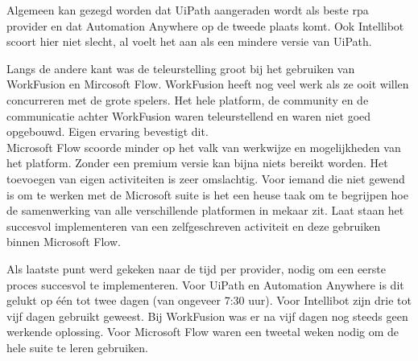 Algemeen kan gezegd worden dat UiPath aangeraden wordt als beste \acrshort{rpa} provider en dat Automation Anywhere op de tweede plaats komt. Ook Intellibot scoort hier niet slecht, al voelt het aan als een mindere versie van UiPath.

Langs de andere kant was de teleurstelling groot bij het gebruiken van WorkFusion en Mircosoft Flow. WorkFusion heeft nog veel werk als ze ooit willen concurreren met de grote spelers. Het hele platform, de community en de communicatie achter WorkFusion waren teleurstellend en waren niet goed opgebouwd. Eigen ervaring bevestigt dit.\\
Microsoft Flow scoorde minder op het valk van werkwijze en mogelijkheden van het platform. Zonder een premium versie kan bijna niets bereikt worden. Het toevoegen van eigen activiteiten is zeer omslachtig. Voor iemand die niet gewend is om te werken met de Microsoft suite is het een heuse taak om te begrijpen hoe de samenwerking van alle verschillende platformen in mekaar zit. Laat staan het succesvol implementeren van een zelfgeschreven activiteit en deze gebruiken binnen Microsoft Flow.

Als laatste punt werd gekeken naar de tijd per provider, nodig om een eerste proces succesvol te implementeren. Voor UiPath en Automation Anywhere is dit gelukt op één tot twee dagen (van ongeveer 7:30 uur). Voor Intellibot zijn drie tot vijf dagen gebruikt geweest. Bij WorkFusion was er na vijf dagen nog steeds geen werkende oplossing. Voor Microsoft Flow waren een tweetal weken nodig om de hele suite te leren gebruiken.